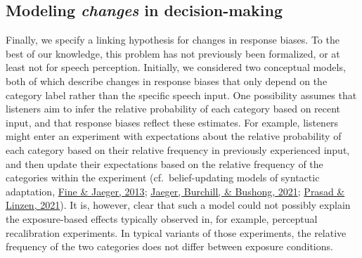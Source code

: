 \documentclass[
  11pt,
  man,floatsintext]{apa6}
\begin{document}
\hypertarget{sec:change-bias}{%
\subsection{\texorpdfstring{Modeling \emph{changes} in decision-making}{Modeling changes in decision-making}}\label{sec:change-bias}}

Finally, we specify a linking hypothesis for changes in response biases. To the best of our knowledge, this problem has not previously been formalized, or at least not for speech perception. Initially, we considered two conceptual models, both of which describe changes in response biases that only depend on the category label rather than the specific speech input. One possibility assumes that listeners aim to infer the relative probability of each category based on recent input, and that response biases reflect these estimates. For example, listeners might enter an experiment with expectations about the relative probability of each category based on their relative frequency in previously experienced input, and then update their expectations based on the relative frequency of the categories within the experiment (cf.~belief-updating models of syntactic adaptation, \protect\hyperlink{ref-fine-jaeger2013}{Fine \& Jaeger, 2013}; \protect\hyperlink{ref-jaeger2019}{Jaeger, Burchill, \& Bushong, 2021}; \protect\hyperlink{ref-prasad2021}{Prasad \& Linzen, 2021}). It is, however, clear that such a model could not possibly explain the exposure-based effects typically observed in, for example, perceptual recalibration experiments. In typical variants of those experiments, the relative frequency of the two categories does not differ between exposure conditions.
\end{document}
